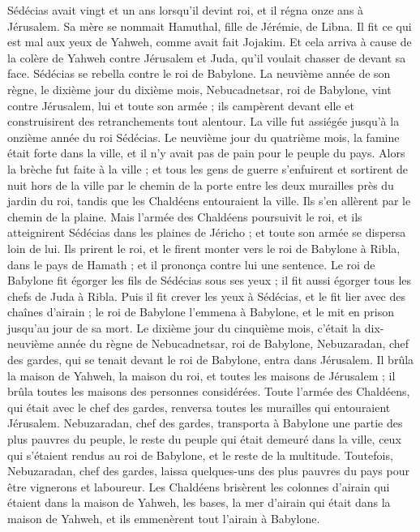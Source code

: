 \begin{multicols}{2}
\VerseOne{}Sédécias avait vingt et un ans lorsqu'il devint roi, et il régna onze ans à Jérusalem. Sa mère se nommait Hamuthal, fille de Jérémie, de Libna.
Il fit ce qui est mal aux yeux de Yahweh, comme avait fait Jojakim.
Et cela arriva à cause de la colère de Yahweh contre Jérusalem et Juda, qu'il voulait chasser de devant sa face. Sédécias se rebella contre le roi de Babylone.
La neuvième année de son règne, le dixième jour du dixième mois, Nebucadnetsar, roi de Babylone, vint contre Jérusalem, lui et toute son armée ; ils campèrent devant elle et construisirent des retranchements tout alentour.
La ville fut assiégée jusqu'à la onzième année du roi Sédécias.
Le neuvième jour du quatrième mois, la famine était forte dans la ville, et il n'y avait pas de pain pour le peuple du pays.
Alors la brèche fut faite à la ville ; et tous les gens de guerre s'enfuirent et sortirent de nuit hors de la ville par le chemin de la porte entre les deux murailles près du jardin du roi, tandis que les Chaldéens entouraient la ville. Ils s'en allèrent par le chemin de la plaine.
Mais l'armée des Chaldéens poursuivit le roi, et ils atteignirent Sédécias dans les plaines de Jéricho ; et toute son armée se dispersa loin de lui.
Ils prirent le roi, et le firent monter vers le roi de Babylone à Ribla, dans le pays de Hamath ; et il prononça contre lui une sentence.
Le roi de Babylone fit égorger les fils de Sédécias sous ses yeux ; il fit aussi égorger tous les chefs de Juda à Ribla.
Puis il fit crever les yeux à Sédécias, et le fit lier avec des chaînes d'airain ; le roi de Babylone l'emmena à Babylone, et le mit en prison jusqu'au jour de sa mort.
Le dixième jour du cinquième mois, c'était la dix-neuvième année du règne de Nebucadnetsar, roi de Babylone, Nebuzaradan, chef des gardes, qui se tenait devant le roi de Babylone, entra dans Jérusalem.
Il brûla la maison de Yahweh, la maison du roi, et toutes les maisons de Jérusalem ; il brûla toutes les maisons des personnes considérées.
Toute l'armée des Chaldéens, qui était avec le chef des gardes, renversa toutes les murailles qui entouraient Jérusalem.
Nebuzaradan, chef des gardes, transporta à Babylone une partie des plus pauvres du peuple, le reste du peuple qui était demeuré dans la ville, ceux qui s'étaient rendus au roi de Babylone, et le reste de la multitude.
Toutefois, Nebuzaradan, chef des gardes, laissa quelques-uns des plus pauvres du pays pour être vignerons et laboureur.
Les Chaldéens brisèrent les colonnes d'airain qui étaient dans la maison de Yahweh, les bases, la mer d'airain qui était dans la maison de Yahweh, et ils emmenèrent tout l'airain à Babylone.

\end{multicols}
